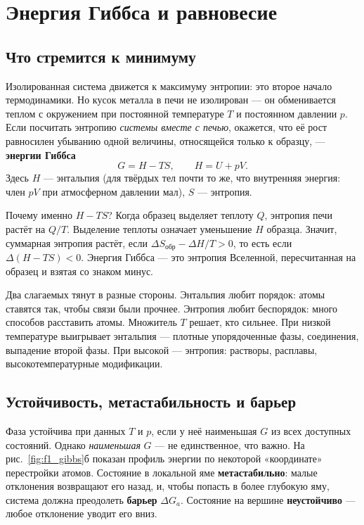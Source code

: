 \chapter{Энергия Гиббса и равновесие}\label{ch:gibbs}

\section{Что стремится к минимуму}

Изолированная система движется к максимуму энтропии: это второе начало термодинамики. Но кусок металла в печи
не изолирован --- он обменивается теплом с окружением при постоянной температуре $T$ и постоянном давлении $p$.
Если посчитать энтропию \emph{системы вместе с печью}, окажется, что её рост равносилен убыванию одной величины,
относящейся только к образцу, --- \textbf{энергии Гиббса}
\begin{equation}
G = H - TS,\qquad H = U + pV .
\end{equation}
Здесь $H$ --- энтальпия (для твёрдых тел почти то же, что внутренняя энергия: член $pV$ при атмосферном давлении
мал), $S$ --- энтропия.

\begin{idea}
Почему именно $H - TS$? Когда образец выделяет теплоту $Q$, энтропия печи растёт на $Q/T$. Выделение теплоты
означает уменьшение $H$ образца. Значит, суммарная энтропия растёт, если $\Delta S_{\text{обр}} - \Delta H/T > 0$,
то есть если $\Delta(H - TS) < 0$. Энергия Гиббса --- это энтропия Вселенной, пересчитанная на образец и взятая
со знаком минус.
\end{idea}

Два слагаемых тянут в разные стороны. Энтальпия любит порядок: атомы ставятся так, чтобы связи были
прочнее. Энтропия любит беспорядок: много способов расставить атомы. Множитель $T$ решает, кто сильнее. При
низкой температуре выигрывает энтальпия --- плотные упорядоченные фазы, соединения, выпадение второй фазы. При
высокой --- энтропия: растворы, расплавы, высокотемпературные модификации.

\section{Устойчивость, метастабильность и барьер}

Фаза устойчива при данных $T$ и $p$, если у неё наименьшая $G$ из всех доступных состояний. Однако
\emph{наименьшая} $G$ --- не единственное, что важно. На рис.~\ref{fig:f1_gibbs}б показан профиль энергии по
некоторой «координате» перестройки атомов. Состояние в локальной яме \textbf{метастабильно}: малые отклонения
возвращают его назад, и, чтобы попасть в более глубокую яму, система должна преодолеть \textbf{барьер}
$\Delta G_a$. Состояние на вершине \textbf{неустойчиво} --- любое отклонение уводит его вниз.

